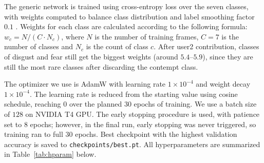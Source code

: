 \documentclass[12pt,a4paper]{article}
\begin{document}
The generic network is trained using cross-entropy loss over the
seven classes, with weights computed to balance class
distribution and label smoothing factor $0.1$
\autocite{szegedy2016rethinking}. Weights for each class are
calculated according to the following formula:
$w_c = N / (C \cdot N_c)$, where $N$ is the number of training
frames, $C = 7$ is the number of classes and $N_c$ is the count
of class $c$. After user2 contribution, classes of disgust and
fear still get the biggest weights (around $5.4$--$5.9$), since
they are still the most rare classes after discarding the
contempt class.

The optimizer we use is AdamW \autocite{loshchilov2019adamw}
with learning rate $1 \times 10^{-4}$ and weight decay
$1 \times 10^{-4}$. The learning rate is reduced from the
starting value using cosine schedule, reaching $0$ over the
planned $30$ epochs of training. We use a batch size of $128$ on
NVIDIA T4 GPU. The early stopping procedure is used, with
patience set to $8$ epochs; however, in the final run, early
stopping was never triggered, so training ran to full $30$
epochs. Best checkpoint with the highest validation accuracy is
saved to \texttt{checkpoints/best.pt}. All hyperparameters are
summarized in Table~\ref{tab:hparam} below.
\end{document}
